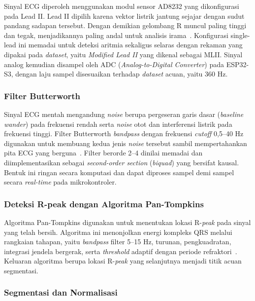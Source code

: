 Sinyal ECG diperoleh menggunakan modul sensor AD8232 yang dikonfigurasi pada Lead II. Lead II dipilih karena vektor listrik jantung sejajar dengan sudut pandang sadapan tersebut. Dengan demikian gelombang R muncul paling tinggi dan tegak, menjadikannya paling andal untuk analisis irama~\cite{ecg_goldberger}. Konfigurasi single-lead ini memadai untuk deteksi aritmia sekaligus selaras dengan rekaman yang dipakai pada \textit{dataset}, yaitu \textit{Modified Lead II} yang dikenal sebagai MLII. Sinyal analog kemudian disampel oleh ADC (\textit{Analog-to-Digital Converter}) pada ESP32-S3, dengan laju sampel disesuaikan terhadap \textit{dataset} acuan, yaitu 360 Hz.

\subsubsection{Filter Butterworth}

Sinyal ECG mentah mengandung \textit{noise} berupa pergeseran garis dasar (\textit{baseline wander}) pada frekuensi rendah serta \textit{noise} otot dan interferensi listrik pada frekuensi tinggi. Filter Butterworth \textit{bandpass} dengan frekuensi \textit{cutoff} 0,5--40 Hz digunakan untuk membuang kedua jenis \textit{noise} tersebut sambil mempertahankan pita ECG yang berguna~\cite{sornmo_laguna_2005, bui_2021}. Filter berorde 2--4 dinilai memadai dan diimplementasikan sebagai \textit{second-order section} (\textit{biquad}) yang bersifat kausal. Bentuk ini ringan secara komputasi dan dapat diproses sampel demi sampel secara \textit{real-time} pada mikrokontroler.

\subsubsection{Deteksi R-peak dengan Algoritma Pan-Tompkins}

Algoritma Pan-Tompkins digunakan untuk menentukan lokasi R-\textit{peak} pada sinyal yang telah bersih. Algoritma ini menonjolkan energi kompleks QRS melalui rangkaian tahapan, yaitu \textit{bandpass} filter 5--15 Hz, turunan, pengkuadratan, integrasi jendela bergerak, serta \textit{threshold} adaptif dengan periode refraktori~\cite{pan_tompkins_1985, li_2020}. Keluaran algoritma berupa lokasi R-\textit{peak} yang selanjutnya menjadi titik acuan segmentasi.

\subsubsection{Segmentasi dan Normalisasi}

